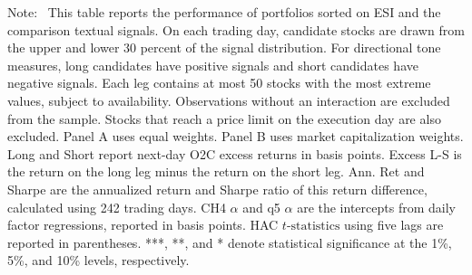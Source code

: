 \documentclass[12pt]{article}
\newenvironment{tablenoteblock}
{%
  \vspace{0.12cm}
  \begin{tablenotes}[flushleft]
  \footnotesize
  \setlength{\itemsep}{0pt}
  \setlength{\parsep}{0pt}
  \item[]\justifying
  \textnormal{Note:}\ 
}
{%
  \end{tablenotes}
}
\begin{document}
\begin{table}[H]
\begin{threeparttable}
  
  \begin{tablenoteblock}
    This table reports the performance of portfolios sorted on ESI and the comparison textual signals. On each trading day, candidate stocks are drawn from the upper and lower 30 percent of the signal distribution. For directional tone measures, long candidates have positive signals and short candidates have negative signals. Each leg contains at most 50 stocks with the most extreme values, subject to availability. Observations without an interaction are excluded from the sample. Stocks that reach a price limit on the execution day are also excluded. Panel A uses equal weights. Panel B uses market capitalization weights. Long and Short report next-day O2C excess returns in basis points. Excess L-S is the return on the long leg minus the return on the short leg. Ann. Ret and Sharpe are the annualized return and Sharpe ratio of this return difference, calculated using 242 trading days. CH4 $\alpha$ and q5 $\alpha$ are the intercepts from daily factor regressions, reported in basis points. HAC $t\text{-statistics}$ using five lags are reported in parentheses. ***, **, and * denote statistical significance at the 1\%, 5\%, and 10\% levels, respectively.
  \end{tablenoteblock}
  \end{threeparttable}
\end{table}
\end{document}
